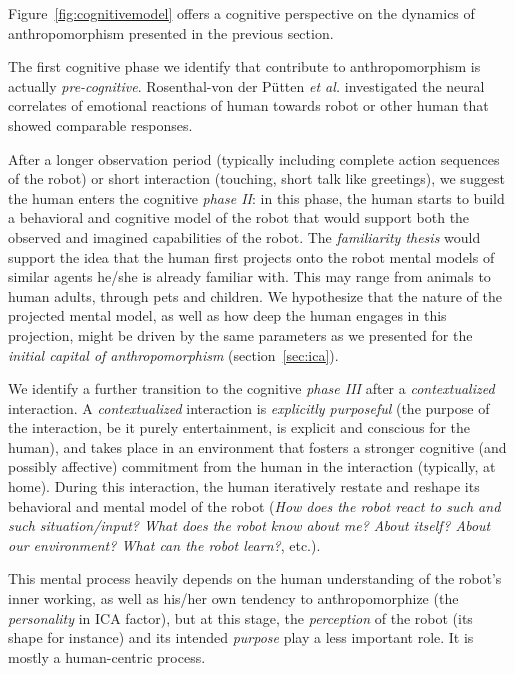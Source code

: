 \documentclass[lettersize, apacite, twoside, HRI]{apa_HRI}
\begin{document}
Figure~\ref{fig:cognitivemodel} offers a cognitive perspective on the dynamics
of anthropomorphism presented in the previous section.

The first cognitive phase we identify that contribute to anthropomorphism is
actually \emph{pre-cognitive}. Rosenthal-von der Pütten \textit{et al.} \cite{rosenthal-vonderputten_experimental_2013} investigated the neural correlates of emotional
reactions of human towards robot or other human that showed comparable
responses. 

After a longer observation period (typically including complete action
sequences of the robot) or short interaction (touching, short talk like
greetings), we suggest the human enters the cognitive \emph{phase II}: in this
phase, the human starts to build a behavioral and cognitive model of the robot
that would support both the observed and imagined capabilities of the robot.
The \emph{familiarity thesis} would support the idea that
the human first projects onto the robot mental models of similar agents he/she
is already familiar with. This may range from animals to human adults, through
pets and children. We hypothesize that the nature of the projected mental
model, as well as how deep the human engages in this projection, might be
driven by the same parameters as we presented for the \emph{initial capital of
anthropomorphism} (section~\ref{sec:ica}).

We identify a further transition to the cognitive \emph{phase III} after a
\emph{contextualized} interaction. A \emph{contextualized} interaction is
\emph{explicitly purposeful} (the purpose of the interaction, be it purely
entertainment, is explicit and conscious for the human), and takes place in an
environment that fosters a stronger cognitive (and possibly affective)
commitment from the human in the interaction (typically, at home). During this
interaction, the human iteratively restate and reshape its behavioral and
mental model of the robot (\emph{How does the robot react to such and such
situation/input? What does the robot know about me? About itself? About our
environment? What can the robot learn?}, etc.).

This mental process heavily depends on the human understanding of the robot's
inner working, as well as his/her own tendency to anthropomorphize (the
\emph{personality} in ICA factor), but at this stage, the \emph{perception} of
the robot (its shape for instance) and its intended \emph{purpose} play a less
important role. It is mostly a human-centric process.
\end{document}
